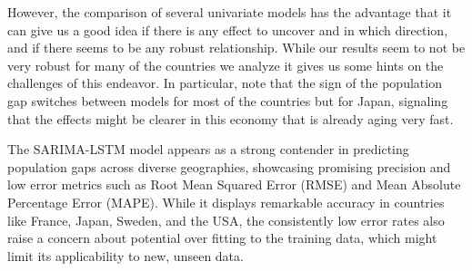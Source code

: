 \documentclass[hidelinks,11pts]{article}
\DeclareMathOperator{\1}{\mathbbm{1}}
\begin{document}
However, the comparison of several univariate models has the advantage that it can give us a good idea if there is any effect to uncover and in which direction, and if there seems to be any robust relationship. While our results seem to not be very robust for many of the countries we analyze it gives us some hints on the challenges of this endeavor. 
In particular, note that the sign of the population gap switches between models for most of the countries but for Japan, signaling that the effects might be clearer in this economy that is already aging very fast. 

The SARIMA-LSTM model appears as a strong contender in predicting population gaps across diverse geographies, showcasing promising precision and low error metrics such as Root Mean Squared Error (RMSE) and Mean Absolute Percentage Error (MAPE). While it displays remarkable accuracy in countries like France, Japan, Sweden, and the USA, the consistently low error rates also raise a concern about potential over fitting to the training data, which might limit its applicability to new, unseen data.








\newpage
\end{document}
